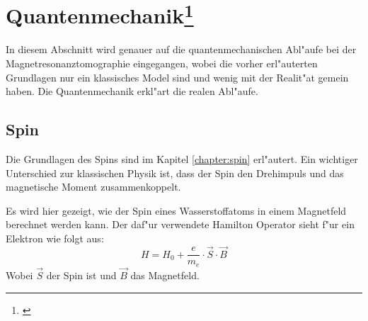 \section[Quantenmechanik]{Quantenmechanik\footnote{\cite{MRI:quanten}}}
\label{sec:quant}
In diesem Abschnitt wird genauer auf die quantenmechanischen Abl"aufe bei der Magnetresonanztomographie eingegangen, wobei die vorher erl"auterten Grundlagen nur ein klassisches Model sind und wenig mit der Realit"at gemein haben. Die Quantenmechanik erkl"art die realen Abl"aufe.


\subsection{Spin}
Die Grundlagen des Spins sind im Kapitel \ref{chapter:spin} erl"autert. Ein wichtiger Unterschied zur klassischen Physik ist, dass der Spin den Drehimpuls und das magnetische Moment zusammenkoppelt.

Es wird hier gezeigt, wie der Spin eines Wasserstoffatoms in einem Magnetfeld berechnet werden kann. Der daf"ur verwendete Hamilton Operator sieht f"ur ein Elektron wie folgt aus:
\begin{equation}
	H = H_0 + \frac{e}{m_e}\cdot \vec{S} \cdot \vec{B}
\end{equation}
Wobei $\vec{S}$ der Spin ist und $\vec{B}$ das Magnetfeld.

